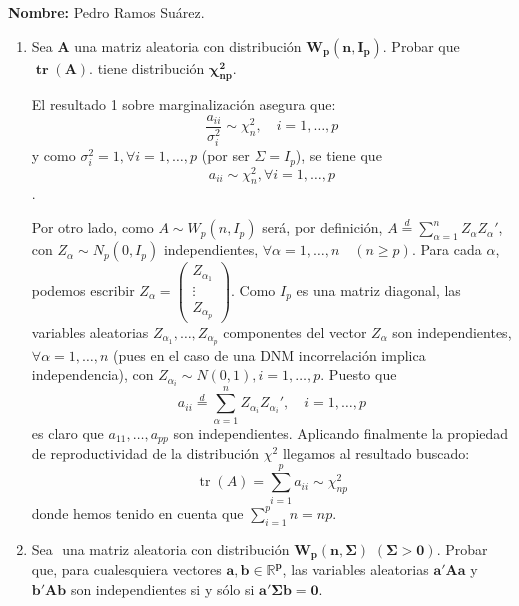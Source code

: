 \documentclass[11pt,a4paper]{article}
\begin{document}

\textbf{Nombre:} Pedro Ramos Suárez.

\begin{enumerate}[label=\arabic*.]
\bfseries
\item Sea $\mathbf{A}$ una matriz aleatoria con distribución $\mathbf{W_{p}(n, I_{p})}$. Probar que $\mathbf{\operatorname{tr}(A)}$. tiene distribución $\mathbf{\chi_{np}^{2}}$.


\vspace{0.5cm}
\normalfont

El resultado 1 sobre marginalización asegura que:
$$\frac{a_{ii}}{\sigma_{i}^{2}} \sim \chi_{n}^{2}, \quad i = 1, \dots, p$$
y como $\sigma_{i}^{2} = 1, \forall i = 1, \dots, p$ (por ser $\Sigma = I_{p}$), se tiene que
$$a_{ii} \sim \chi_{n}^{2}, \forall i = 1, \dots, p$$.

Por otro lado, como $A \sim W_{p}(n, I_{p})$ será, por definición, $A \overset{d}{=} \sum_{\alpha=1}^{n} Z_{\alpha}Z_{\alpha}'$, con $Z_{\alpha} \sim N_{p}(0, I_{p})$ independientes, $\forall \alpha = 1, \dots, n \quad (n \geq p)$. Para cada $\alpha$, podemos escribir $Z_{\alpha} = \begin{pmatrix} Z_{\alpha_{1}} \\ \vdots \\ Z_{\alpha_{p}} \end{pmatrix}$. Como $I_{p}$ es una matriz diagonal, las variables aleatorias $Z_{\alpha_{1}}, \dots, Z_{\alpha_{p}}$ componentes del vector $Z_{\alpha}$ son independientes, $\forall \alpha = 1, \dots, n$ (pues en el caso de una DNM incorrelación implica independencia), con $Z_{\alpha_{i}} \sim N(0, 1), i = 1, \dots, p$. Puesto que
$$a_{ii} \overset{d}{=} \sum_{\alpha=1}^{n} Z_{\alpha_{i}}Z_{\alpha_{i}}', \quad i = 1, \dots, p$$
es claro que $a_{11}, \dots, a_{pp}$ son independientes. Aplicando finalmente la propiedad de reproductividad de la distribución $\chi^{2}$ llegamos al resultado buscado:
$$\operatorname{tr}(A) = \sum_{i=1}^{p} a_{ii} \sim \chi_{np}^{2}$$
donde hemos tenido en cuenta que $\sum_{i=1}^{p} n = np$.

\newpage
\bfseries
\item Sea $\mathbf{}$ una matriz aleatoria con distribución $\mathbf{W_{p}(n, \Sigma)}$ $\mathbf{(\Sigma > 0)}$. Probar que, para cualesquiera vectores $\mathbf{a, b \in \mathbb{R}^{p}}$, las variables aleatorias $\mathbf{a'Aa}$ y $\mathbf{b'Ab}$ son independientes si y sólo si $\mathbf{a' \Sigma b = 0}$.

\vspace{0.5cm}
\normalfont


\end{enumerate}
\end{document}
